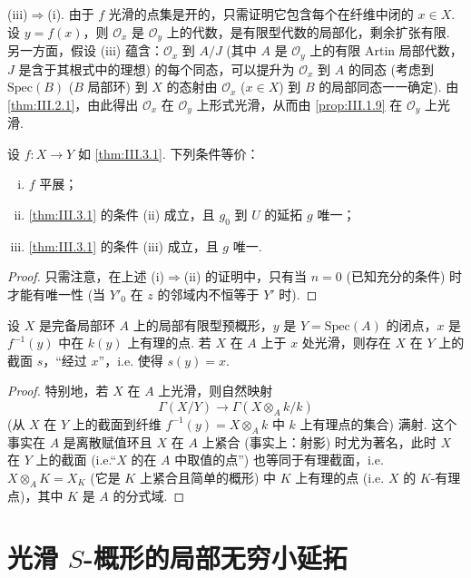 (iii)$\Rightarrow$(i). 由于 $f$ 光滑的点集是开的，只需证明它包含每个在纤维中闭的 $x \in X$. 设 $y = f(x)$，则 $\mathcal{O}_x$ 是 $\mathcal{O}_y$ 上的代数，是有限型代数的局部化，剩余扩张有限. 另一方面，假设 (iii) 蕴含：$\mathcal{O}_x$ 到 $A/J$ (其中 $A$ 是 $\mathcal{O}_y$ 上的有限 Artin 局部代数，$J$ 是含于其根式中的理想) 的每个同态，可以提升为 $\mathcal{O}_x$ 到 $A$ 的同态 (考虑到 $\mathrm{Spec}(B)$ ($B$ 局部环) 到 $X$ 的态射由 $\mathcal{O}_x$ ($x \in X$) 到 $B$ 的局部同态一一确定). 由 \ref{thm:III.2.1}，由此得出 $\mathcal{O}_x$ 在 $\mathcal{O}_y$ 上形式光滑，从而由 \ref{prop:III.1.9} 在 $\mathcal{O}_y$ 上光滑.

\begin{corollary}\label{cor:III.3.2}
设 $f \colon X \to Y$ 如 \ref{thm:III.3.1}. 下列条件等价：
\begin{enumerate}[(i)]
\item $f$ 平展；
 \item \ref{thm:III.3.1} 的条件 (ii) 成立，且 $g_0$ 到 $U$ 的延拓 $g$ 唯一；
 \item \ref{thm:III.3.1} 的条件 (iii) 成立，且 $g$ 唯一.
\end{enumerate}
\end{corollary}

\begin{proof}
只需注意，在上述 (i)$\Rightarrow$(ii) 的证明中，只有当 $n = 0$ (已知充分的条件) 时才能有唯一性 (当 $Y'_0$ 在 $z$ 的邻域内不恒等于 $Y'$ 时).
\end{proof}

\begin{corollary}\label{cor:III.3.3}
设 $X$ 是完备局部环 $A$ 上的局部有限型预概形，$y$ 是 $Y = \mathrm{Spec}(A)$ 的闭点，$x$ 是 $f^{-1}(y)$ 中在 $k(y)$ 上有理的点. 若 $X$ 在 $A$ 上于 $x$ 处光滑，则存在 $X$ 在 $Y$ 上的截面 $s$，``经过 $x$''，i.e. 使得 $s(y) = x$.
\end{corollary}

\begin{proof}
特别地，若 $X$ 在 $A$ 上光滑，则自然映射
\[
\Gamma(X/Y) \longrightarrow \Gamma(X \otimes_A k/k)
\]
(从 $X$ 在 $Y$ 上的截面到纤维 $f^{-1}(y) = X \otimes_A k$ 中 $k$ 上有理点的集合) 满射. 这个事实在 $A$ 是离散赋值环且 $X$ 在 $A$ 上紧合 (事实上：射影) 时尤为著名，此时 $X$ 在 $Y$ 上的截面 (i.e.``$X$ 的在 $A$ 中取值的点'') 也等同于有理截面，i.e. $X \otimes_A K = X_K$ (它是 $K$ 上紧合且简单的概形) 中 $K$ 上有理的点 (i.e. $X$ 的 $K$-有理点)，其中 $K$ 是 $A$ 的分式域.
\end{proof}

\section{光滑 \texorpdfstring{$S$-概形}{S-概形}的局部无穷小延拓}

